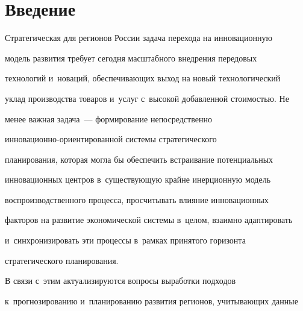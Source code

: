 















      \thispagestyle{headings}


      


      \vspace*{-20pt} 


  


\section{Введение}





  Стратегическая для регионов России задача перехода на инновационную 


модель развития требует сегодня масштабного внедрения передовых 


технологий и~новаций, обеспечивающих выход на новый технологический 


уклад производства товаров и~услуг с~высокой добавленной сто\-и\-мостью. Не 


менее важная задача~--- формирование непосредственно  


ин\-но\-ва\-ци\-он\-но-ори\-ен\-ти\-ро\-ван\-ной сис\-те\-мы стратегического 


планирования, которая могла бы обеспечить встраивание потенциальных 


инновационных цент\-ров в~существующую крайне инерционную модель 


воспроизводственного процесса, просчитывать влияние инновационных 


факторов на развитие экономической сис\-те\-мы в~целом, взаимно адаптировать 


и~синхронизировать эти процессы в~рам\-ках принятого горизонта 


стратегического планирования. 


  


  В связи с~этим актуализируются вопросы выработки подходов 


к~прогнозированию и~планированию развития регионов, учитывающих данные 


